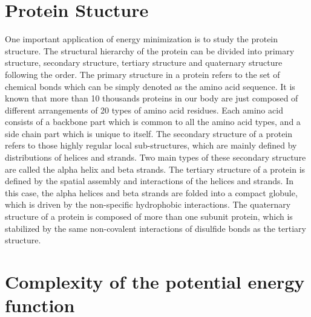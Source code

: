 
\section{Protein Stucture}

One important application of energy minimization is to study the protein structure. The structural hierarchy of the protein can
 be divided into primary structure, secondary structure, tertiary structure and quaternary structure following the order\cite{protein}. 
The primary structure in a protein refers to the set of chemical bonds which can be simply denoted as the amino acid sequence. 
It is known that more than 10 thousands proteins in our body are just composed of different arrangements of 20 types of amino acid
residues. Each amino acid consists of a backbone part which is common to all the amino acid types, and a side chain part which is
unique to itself.  The secondary structure of a protein refers to those highly regular local sub-structures, which are mainly defined
by distributions of helices and strands. Two main types of these secondary structure are called the alpha helix and beta strands.
The tertiary structure of a protein is defined by the spatial assembly and interactions of the helices and strands. In this case,
the alpha helices and beta strands are folded into a compact globule, which is driven by the non-specific hydrophobic interactions.
The quaternary structure of a protein is composed of more than one subunit protein, which is stabilized by the same non-covalent 
interactions of disulfide bonds as the tertiary structure.

\section{Complexity of the potential energy function}


